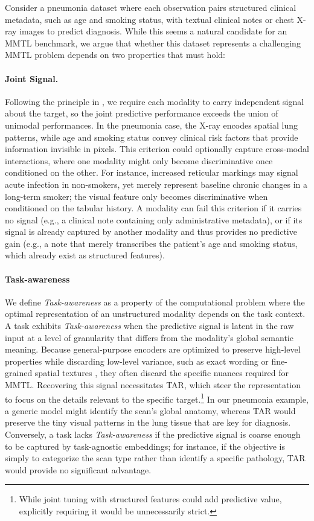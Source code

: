 \documentclass{article}
\begin{document}
Consider a pneumonia dataset where each observation pairs structured clinical metadata, such as age and smoking status, with textual clinical notes or chest X-ray images to predict diagnosis.
While this seems a natural candidate for an MMTL benchmark, we argue that whether this dataset represents a challenging MMTL problem depends on two properties that must hold:

\paragraph{Joint Signal.} Following the principle in \citet{mraz_towards_2025}, we require each modality to carry independent signal about the target, so the joint predictive performance exceeds the union of unimodal performances. In the pneumonia case, the X-ray encodes spatial lung patterns, while age and smoking status convey clinical risk factors that provide information invisible in pixels. This criterion could optionally capture cross-modal interactions, where one modality might only become discriminative once conditioned on the other. For instance, increased reticular markings may signal acute infection in non-smokers, yet merely represent baseline chronic changes in a long-term smoker; the visual feature only becomes discriminative when conditioned on the tabular history. A modality can fail this criterion if it carries no signal (e.g., a clinical note containing only administrative metadata), or if its signal is already captured by another modality and thus provides no predictive gain (e.g., a note that merely transcribes the patient's age and smoking status, which already exist as structured features).

\paragraph{Task-awareness} We define \textit{Task-awareness} as a property of the computational problem where the optimal representation of an unstructured modality depends on the task context. A task exhibits \textit{Task-awareness} when the predictive signal is latent in the raw input at a level of granularity that differs from the modality's global semantic meaning. Because general-purpose encoders are optimized to preserve high-level properties while discarding low-level variance, such as exact wording \cite{weller_theoretical_2025} or fine-grained spatial textures \cite{pantazopoulos_lost_2024}, they often discard the specific nuances required for MMTL. Recovering this signal necessitates TAR, which steer the representation to focus on the details relevant to the specific target.\footnote{While joint tuning with structured features could add predictive value, explicitly requiring it would be unnecessarily strict.} In our pneumonia example, a generic model might identify the scan's global anatomy, whereas TAR would preserve the tiny visual patterns in the lung tissue that are key for diagnosis. Conversely, a task lacks \textit{Task-awareness} if the predictive signal is coarse enough to be captured by task-agnostic embeddings; for instance, if the objective is simply to categorize the scan type rather than identify a specific pathology, TAR would provide no significant advantage. 
\end{document}
